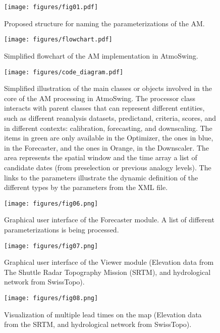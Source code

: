 \documentclass[review]{elsarticle}
\begin{document}
\begin{figure}[t]
	\texttt{[image: figures/fig01.pdf]}
	\caption{Proposed structure for naming the parameterizations of the AM.}
	\label{figure:nomenclature}
\end{figure}

\begin{figure}[t]
	\texttt{[image: figures/flowchart.pdf]}
	\caption{Simplified flowchart of the AM implementation in AtmoSwing.}
	\label{figure:flowchart_modules_atmoswing}
\end{figure}

\begin{figure*}[t]
	\texttt{[image: figures/code\_diagram.pdf]}
	\caption{Simplified illustration of the main classes or objects involved in the core of the AM processing in AtmoSwing. The processor class interacts with parent classes that can represent different entities, such as different reanalysis datasets, predictand, criteria, scores, and in different contexts: calibration, forecasting, and downscaling. The items in green are only available in the Optimizer, the ones in blue, in the Forecaster, and the ones in Orange, in the Downscaler. The area represents the spatial window and the time array a list of candidate dates (from preselection or previous analogy levels). The links to the parameters illustrate the dynamic definition of the different types by the parameters from the XML file.}
	\label{figure:code_diagram}
\end{figure*}

\begin{figure}[t]
	\texttt{[image: figures/fig06.png]}
	\caption{Graphical user interface of the Forecaster module. A list of different parameterizations is being processed.}
	\label{figure:atmoswing-forecaster-gui}
\end{figure}

\begin{figure*}[t]
	\texttt{[image: figures/fig07.png]}
	\caption{Graphical user interface of the Viewer module (Elevation data from The Shuttle Radar Topography Mission (SRTM), and hydrological network from SwissTopo).}
	\label{figure:atmoswing-viewer-gui}
\end{figure*}

\begin{figure}[t]
	\texttt{[image: figures/fig08.png]}
	\caption{Visualization of multiple lead times on the map (Elevation data from the SRTM, and hydrological network from SwissTopo).}
	\label{figure:atmoswing-viewer-snail}
\end{figure}
\end{document}
